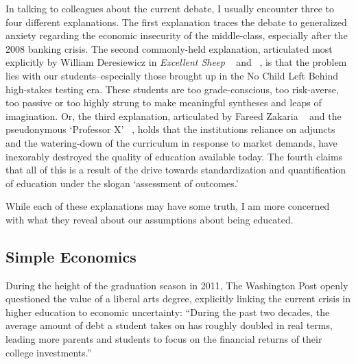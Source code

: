 In talking to colleagues about the current debate, I usually encounter three to four different explanations. The first explanation traces the debate to generalized anxiety regarding the economic insecurity of the middle-class, especially after the 2008 banking crisis. The second commonly-held explanation, articulated most explicitly by William Deresiewicz in \emph{Excellent Sheep} ~\citep{Deresiewicz:2014ue} and ~\citep{Deresiewicz:2016vd}, is that the problem lies with our students--especially those brought up in the No Child Left Behind high-stakes testing era. These students are too grade-conscious, too risk-averse, too passive or too highly strung to make meaningful syntheses and leaps of imagination. Or, the third explanation, articulated by Fareed Zakaria ~\citep{Zakaria:2015uy} and the pseudonymous `Professor X' ~\citep{X:2008tk}, holds that the institutions reliance on adjuncts and the watering-down of the curriculum in response to market demands, have inexorably destroyed the quality of education available today. The fourth claims that all of this is a result of the drive towards standardization and quantification of education under the slogan `assessment of outcomes.'

While each of these explanations may have some truth, I am more concerned with what they reveal about our assumptions about being educated.

\subsection{Simple Economics}
\label{simpleeconomics}

During the height of the graduation season in 2011, The Washington Post openly questioned the value of a liberal arts degree, explicitly linking the current crisis in higher education to economic uncertainty: ``During the past two decades, the average amount of debt a student takes on has roughly doubled in real terms, leading more parents and students to focus on the financial returns of their college investments.'' ~\citep{Whoriskey:2011vm}

